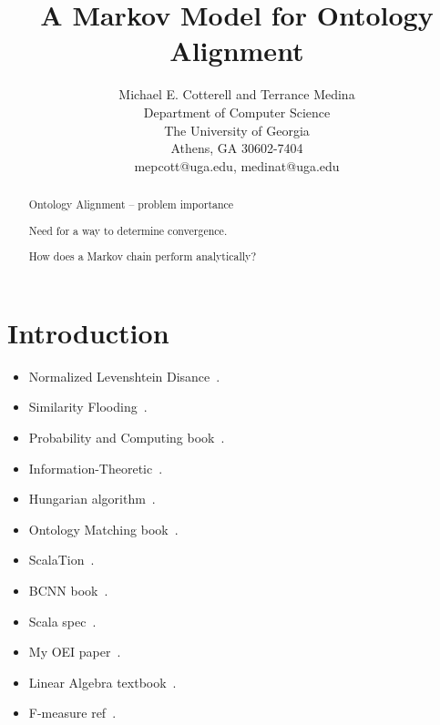 \documentclass[letterpaper,twocolumn,12pt]{article}
\begin{document}
\newtheorem{defn}{Definition}

\title{A Markov Model for Ontology Alignment}

\author{Michael E. Cotterell and Terrance Medina \\
Department of Computer Science \\
The University of Georgia \\
Athens, GA 30602-7404 \\
mepcott@uga.edu, medinat@uga.edu
}

\maketitle

\begin{abstract}
Ontology Alignment -- problem importance

Need for a way to determine convergence.

How does a Markov chain perform analytically?

\end{abstract}


\section{Introduction}

\begin{itemize}
\item Normalized Levenshtein Disance~\cite{yujian:2007:levenshtein}. 
\item Similarity Flooding~\cite{melnik:2002:similarity}.
\item Probability and Computing book~\cite{mitzenmacher:2005:probability}.
\item Information-Theoretic~\cite{lin:1998:information}.
\item Hungarian algorithm~\cite{kuhn:1955:hungarian}.
\item Ontology Matching book~\cite{euzenat:2007:ontology}.
\item ScalaTion~\cite{miller:2010:scalation}.
\item BCNN book~\cite{bcnn:2010:simulation}.
\item Scala spec~\cite{odersky:2011:spec}.
\item My OEI paper~\cite{cotterell:2012:oei}.
\item Linear Algebra textbook~\cite{goodaire:2003:linalgebra}.
\item F-measure ref~\cite{rijsbergen:1979:ir}.
\end{itemize}
\end{document}
